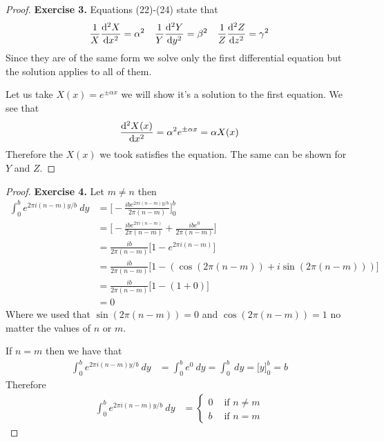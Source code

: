 \documentclass[11pt]{article}
\theoremstyle{definition}
\begin{document}
\begin{proof}{\textbf{Exercise 3.}}
    Equations (22)-(24) state that
    \begin{align*}
        \frac{1}{X}\dv[2]{X}{x} = \alpha^2 \quad 
        \frac{1}{Y}\dv[2]{Y}{y} = \beta^2 \quad
        \frac{1}{Z}\dv[2]{Z}{z} = \gamma^2
    \end{align*}
    Since they are of the same form we solve only the first differential
    equation but the solution applies to all of them.

    Let us take $X(x) = e^{\pm \alpha x}$ we will show it's a solution to the
    first equation. We see that
    \begin{align*}
        \dv[2]{X(x)}{x} = \alpha^2 e^{\pm\alpha x} = \alpha X(x)
    \end{align*}
    Therefore the $X(x)$ we took satisfies the equation. The same can be shown
    for $Y$ and $Z$.
\end{proof}
\cleardoublepage
\begin{proof}{\textbf{Exercise 4.}}
    Let $m \neq n$ then
    \begin{align*}
        \int_0^b e^{2\pi i(n-m)y/b} ~dy
        &= \bigg[-\frac{ib e^{2\pi i(n-m)y/b}}{2\pi(n-m)} \bigg]_0^b\\
        &= \bigg[
            -\frac{ibe^{2\pi i(n-m)}}{2\pi (n-m)} + \frac{ib e^0}{2\pi (n-m)}
        \bigg]\\
        &= \frac{ib}{2\pi (n-m)}\big[1-e^{2\pi i(n-m)}\big]\\
        &= \frac{ib}{2\pi (n-m)}\big[1-(\cos(2\pi (n-m)) + i\sin (2\pi(n-m)))\big]\\
        &= \frac{ib}{2\pi (n-m)}\big[1- (1 + 0)\big]\\
        &= 0
    \end{align*}
    Where we used that $\sin (2\pi(n-m)) = 0$ and $\cos(2\pi (n-m)) = 1$ no
    matter the values of $n$ or $m$.

    If $n = m$ then we have that
    \begin{align*}
        \int_0^b e^{2\pi i (n -m) y/b} ~dy
        &= \int_0^b e^{0} ~dy = \int_0^b~dy = \big[y\big]_0^b = b
    \end{align*}
    Therefore 
    \begin{align*}
        \int_0^b e^{2\pi i (n -m) y/b} ~dy
        &= \begin{cases}
            0 &\text{ if }n \neq m\\
            b &\text{ if }n = m
        \end{cases}
    \end{align*}
\end{proof}
\end{document}
